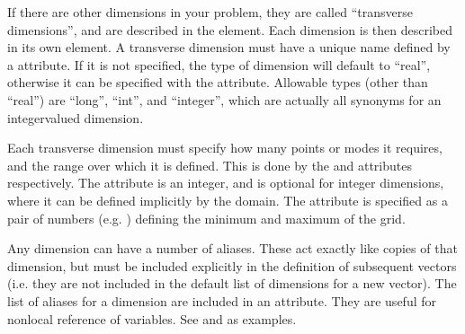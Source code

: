 \documentclass[letterpaper,10pt,english]{sphinxmanual}
\begin{document}
\ignorespaces {}\label{\detokenize{reference_elements:transversedimensionselement}}
\ignorespaces {}\label{\detokenize{reference_elements:dimensionelement}}
\sphinxAtStartPar
If there are other dimensions in your problem, they are called “transverse dimensions”, and are described in the  element.  Each dimension is then described in its own  element.  A transverse dimension must have a unique name defined by a  attribute.  If it is not specified, the type of dimension will default to “real”, otherwise it can be specified with the  attribute.  Allowable types (other than “real”) are “long”, “int”, and “integer”, which are actually all synonyms for an integer\sphinxhyphen{}valued dimension.

\ignorespaces 
\sphinxAtStartPar
Each transverse dimension must specify how many points or modes it requires, and the range over which it is defined.  This is done by the  and  attributes respectively.  The  attribute is an integer, and is optional for integer dimensions, where it can be defined implicitly by the domain.  The  attribute is specified as a pair of numbers (e.g. ) defining the minimum and maximum of the grid.

\ignorespaces 
\sphinxAtStartPar
Any dimension can have a number of aliases.  These act exactly like copies of that dimension, but must be included explicitly in the definition of subsequent vectors (i.e. they are not included in the default list of dimensions for a new vector).  The list of aliases for a dimension are included in an  attribute.  They are useful for non\sphinxhyphen{}local reference of variables.  See  and  as examples.
\end{document}
